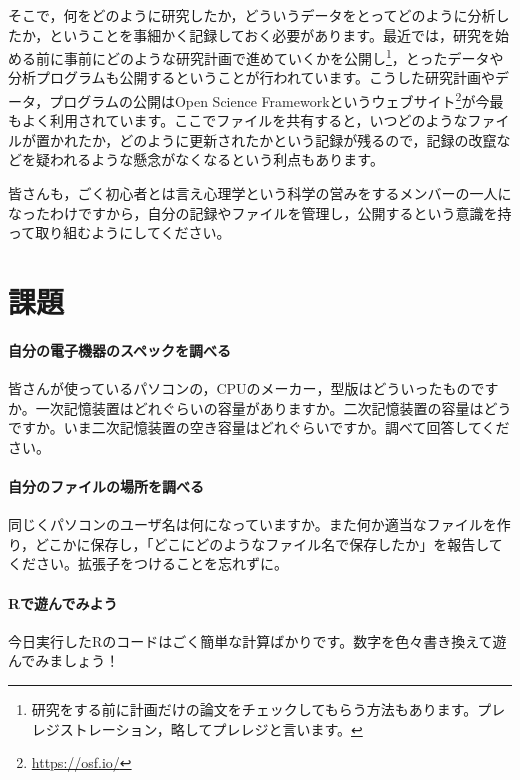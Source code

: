 \documentclass{ltjsbook}
\begin{document}
そこで，何をどのように研究したか，どういうデータをとってどのように分析したか，ということを事細かく記録しておく必要があります。最近では，研究を始める前に事前にどのような研究計画で進めていくかを公開し\footnote{研究をする前に計画だけの論文をチェックしてもらう方法もあります。プレレジストレーション，略してプレレジと言います。}，とったデータや分析プログラムも公開するということが行われています。こうした研究計画やデータ，プログラムの公開はOpen Science Frameworkというウェブサイト\footnote{\url{https://osf.io/}}が今最もよく利用されています。ここでファイルを共有すると，いつどのようなファイルが置かれたか，どのように更新されたかという記録が残るので，記録の改竄などを疑われるような懸念がなくなるという利点もあります。

皆さんも，ごく初心者とは言え心理学という科学の営みをするメンバーの一人になったわけですから，自分の記録やファイルを管理し，公開するという意識を持って取り組むようにしてください。

\section{課題}
\paragraph{自分の電子機器のスペックを調べる}
皆さんが使っているパソコンの，CPUのメーカー，型版はどういったものですか。一次記憶装置はどれぐらいの容量がありますか。二次記憶装置の容量はどうですか。いま二次記憶装置の空き容量はどれぐらいですか。調べて回答してください。
\paragraph{自分のファイルの場所を調べる}
同じくパソコンのユーザ名は何になっていますか。また何か適当なファイルを作り，どこかに保存し，「どこにどのようなファイル名で保存したか」を報告してください。拡張子をつけることを忘れずに。
\paragraph{Rで遊んでみよう}
今日実行したRのコードはごく簡単な計算ばかりです。数字を色々書き換えて遊んでみましょう！
\end{document}
